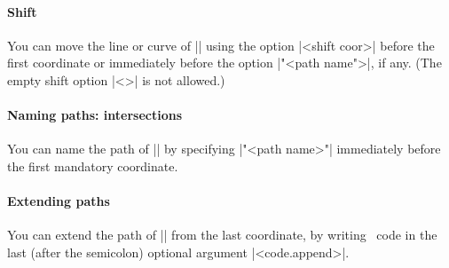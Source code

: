 \paragraph{Shift}
You can move the line or curve of |\tztos|
using the option |<shift coor>| before the first coordinate or immediately before the option |"<path name">|, if any.
(The empty shift option |<>| is not allowed.)

\begin{tzcode}{.3}
\end{tzcode}



\paragraph{Naming paths: intersections}
You can name the path of |\tztos| by specifying |"<path name>"| immediately before the first mandatory coordinate.

\begin{tzcode}{.3}
\end{tzcode}


\paragraph{Extending paths}
You can extend the path of |\tztos| from the last coordinate,
by writing \Tikz\ code in the last (after the semicolon) optional argument |<code.append>|.

\begin{tzcode}{.3}
{}
\end{tzcode}

